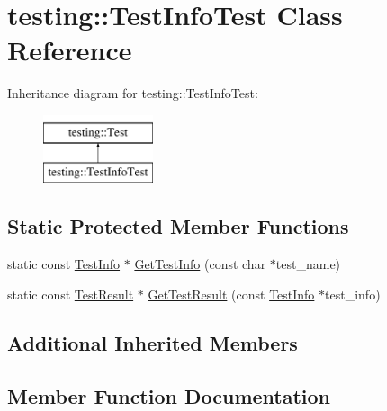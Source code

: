 \hypertarget{classtesting_1_1TestInfoTest}{}\section{testing\+::Test\+Info\+Test Class Reference}
\label{classtesting_1_1TestInfoTest}
Inheritance diagram for testing\+::Test\+Info\+Test\+:\begin{figure}[H]
\begin{center}
\leavevmode
\includegraphics[height=2.000000cm]{classtesting_1_1TestInfoTest}
\end{center}
\end{figure}
\subsection*{Static Protected Member Functions}
\begin{DoxyCompactItemize}
\item 
static const \mbox{\hyperlink{classtesting_1_1TestInfo}{Test\+Info}} $\ast$ \mbox{\hyperlink{classtesting_1_1TestInfoTest_a4140c1302bf53c7f1375a23923624f04}{Get\+Test\+Info}} (const char $\ast$test\+\_\+name)
\item 
static const \mbox{\hyperlink{classtesting_1_1TestResult}{Test\+Result}} $\ast$ \mbox{\hyperlink{classtesting_1_1TestInfoTest_a154b3679b1aa00ad037ce46eb60d18c3}{Get\+Test\+Result}} (const \mbox{\hyperlink{classtesting_1_1TestInfo}{Test\+Info}} $\ast$test\+\_\+info)
\end{DoxyCompactItemize}
\subsection*{Additional Inherited Members}


\subsection{Member Function Documentation}
\mbox{\label{classtesting_1_1TestInfoTest_a4140c1302bf53c7f1375a23923624f04}} 
